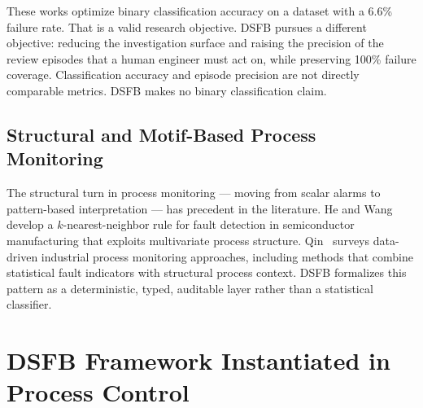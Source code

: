 \documentclass[11pt,letterpaper]{article}
\theoremstyle{scresult}
\begin{document}
These works optimize binary classification accuracy on a dataset with a 6.6\%
failure rate. That is a valid research objective. DSFB pursues a different
objective: reducing the investigation surface and raising the precision of the
review episodes that a human engineer must act on, while preserving 100\%
failure coverage. Classification accuracy and episode precision are not directly
comparable metrics. DSFB makes no binary classification claim.

\subsection{Structural and Motif-Based Process Monitoring}

The structural turn in process monitoring --- moving from scalar alarms to
pattern-based interpretation --- has precedent in the literature. He and
Wang~\cite{he2007} develop a $k$-nearest-neighbor rule for fault detection in
semiconductor manufacturing that exploits multivariate process structure.
Qin~\cite{qin2012survey} surveys data-driven industrial process monitoring
approaches, including methods that combine statistical fault indicators with
structural process context. DSFB formalizes this pattern as a deterministic,
typed, auditable layer rather than a statistical classifier.

\section{DSFB Framework Instantiated in Process Control}
\label{sec:instantiation}
\end{document}
